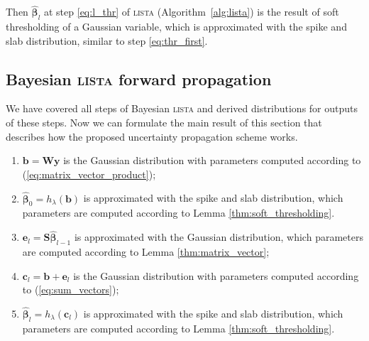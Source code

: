 \documentclass{article}
\begin{document}
Then $\widehat{\boldsymbol\beta}_{l}$ at step \ref{eq:l_thr} of \textsc{lista} (Algorithm~\ref{alg:lista}) is the result of soft thresholding of a Gaussian variable, which is approximated with the spike and slab distribution,  similar to step \ref{eq:thr_first}.

\subsection{Bayesian \textsc{lista} forward propagation}
We have covered all steps of Bayesian \textsc{lista} and derived distributions for outputs of these steps. Now we can formulate the main result of this section that describes how the proposed uncertainty propagation scheme works.

\begin{enumerate}
	\item $\mathbf{b} = \mathbf{W}\mathbf{y}$ is the Gaussian distribution with parameters computed according to (\ref{eq:matrix_vector_product});
	\item $\widehat{\boldsymbol\beta}_{0} = h_\lambda(\mathbf{b})$ is approximated with the spike and slab distribution, which parameters are computed according to Lemma \ref{thm:soft_thresholding}.
	\item $\mathbf{e}_l = \mathbf{S}\widehat{\boldsymbol\beta}_{l-1}$ is approximated with the Gaussian distribution, which parameters are computed according to Lemma \ref{thm:matrix_vector};
	\item $\mathbf{c}_l = \mathbf{b} + \mathbf{e}_l$ is the Gaussian distribution with parameters computed according to (\ref{eq:sum_vectors});
	\item $\widehat{\boldsymbol\beta}_{l} = h_\lambda(\mathbf{c}_l)$ is approximated with the spike and slab distribution, which parameters are computed according to Lemma \ref{thm:soft_thresholding}.
\end{enumerate}


%
\end{document}

